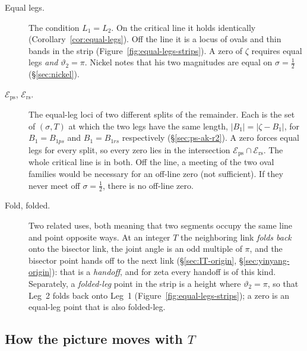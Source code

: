 \documentclass[11pt]{article}
\theoremstyle{definition}
\begin{document}
\begin{description}
\item[Equal legs.]
The condition $L_1=L_2$.
On the critical line it holds identically
(Corollary~\ref{cor:equal-legs}).
Off the line it is a locus of ovals and thin bands in the strip
(Figure~\ref{fig:equal-legs-strips}).
A zero of $\zeta$ requires equal legs \emph{and} $\vartheta_2=\pi$.
Nickel notes that his two magnitudes are equal on
$\sigma=\tfrac12$ (\S\ref{sec:nickel}).

\item[$\mathcal{E}_{\mathrm{ps}}$, $\mathcal{E}_{\mathrm{rs}}$.]
The equal-leg loci of two different splits of the remainder.
Each is the set of $(\sigma,T)$ at which the two legs have the
same length, $|B_1|=|\zeta-B_1|$, for $B_1=B_{1ps}$ and
$B_1=B_{1rs}$ respectively
(\S\ref{sec:ps-ak-r2}).
A zero forces equal legs for every split, so every zero lies in
the intersection
$\mathcal{E}_{\mathrm{ps}}\cap\mathcal{E}_{\mathrm{rs}}$.
The whole critical line is in both.
Off the line, a meeting of the two oval families would be
necessary for an off-line zero (not sufficient).
If they never meet off $\sigma=\tfrac12$, there is no off-line
zero.

\item[Fold, folded.]
Two related uses, both meaning that two segments occupy the same
line and point opposite ways.
At an integer $T$ the neighboring link \emph{folds back} onto the
bisector link, the joint angle is an odd multiple of $\pi$, and
the bisector point hands off to the next link
(\S\ref{sec:IT-origin}, \S\ref{sec:yinyang-origin}): that is a
\emph{handoff}, and for zeta every handoff is of this kind.
Separately, a \emph{folded-leg} point in the strip is a height
where $\vartheta_2=\pi$, so that Leg~2 folds back onto Leg~1
(Figure~\ref{fig:equal-legs-strips}); a zero is an equal-leg point
that is also folded-leg.
\end{description}

\subsection*{How the picture moves with $T$}
\end{document}
